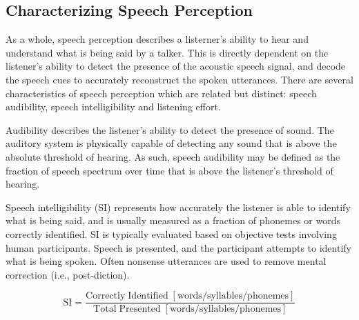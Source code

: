 \subsection{Characterizing Speech Perception}

As a whole, speech perception describes a listerner's ability to hear and understand what is being said by a talker. This is directly dependent on the listener's ability to detect the presence of the acoustic speech signal, and decode the speech cues to accurately reconstruct the spoken utterances. There are several characteristics of speech perception which are related but distinct: speech audibility, speech intelligibility and listening effort.

Audibility describes the listener's ability to detect the presence of sound. The auditory system is physically capable of detecting any sound that is above the absolute threshold of hearing. As such, speech audibility may be defined as the fraction of speech spectrum over time that is above the listener's threshold of hearing.

Speech intelligibility (SI) represents how accurately the listener is able to identify what is being said, and is usually measured as a fraction of phonemes or words correctly identified. SI is typically evaluated based on objective tests involving human participants. Speech is presented, and the participant attempts to identify what is being spoken. Often nonsense utterances are used to remove mental correction (i.e., post-diction). 

\[\mathrm{SI} = \frac{\mathrm{Correctly \; Identified \; [words/syllables/phonemes]}}{\mathrm{Total \; Presented \;  [words/syllables/phonemes]}}\]

